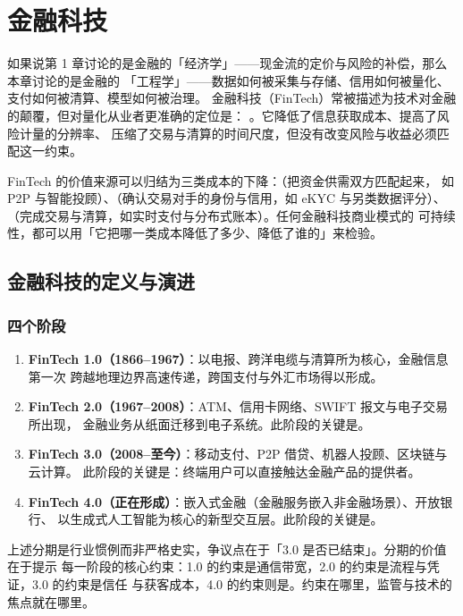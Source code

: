\chapter{金融科技}

如果说第 1 章讨论的是金融的「经济学」——现金流的定价与风险的补偿，那么本章讨论的是金融的
「工程学」——数据如何被采集与存储、信用如何被量化、支付如何被清算、模型如何被治理。
金融科技（FinTech）常被描述为技术对金融的颠覆，但对量化从业者更准确的定位是：
。它降低了信息获取成本、提高了风险计量的分辨率、
压缩了交易与清算的时间尺度，但没有改变风险与收益必须匹配这一约束。

\begin{keybox}
FinTech 的价值来源可以归结为三类成本的下降：（把资金供需双方匹配起来，
如 P2P 与智能投顾）、（确认交易对手的身份与信用，如 eKYC 与另类数据评分）、
（完成交易与清算，如实时支付与分布式账本）。任何金融科技商业模式的
可持续性，都可以用「它把哪一类成本降低了多少、降低了谁的」来检验。
\end{keybox}

\section{金融科技的定义与演进}

\subsection{四个阶段}

\begin{enumerate}[leftmargin=*]
  \item \textbf{FinTech 1.0（1866--1967）}：以电报、跨洋电缆与清算所为核心，金融信息第一次
        跨越地理边界高速传递，跨国支付与外汇市场得以形成。
  \item \textbf{FinTech 2.0（1967--2008）}：ATM、信用卡网络、SWIFT 报文与电子交易所出现，
        金融业务从纸面迁移到电子系统。此阶段的关键是。
  \item \textbf{FinTech 3.0（2008--至今）}：移动支付、P2P 借贷、机器人投顾、区块链与云计算。
        此阶段的关键是：终端用户可以直接触达金融产品的提供者。
  \item \textbf{FinTech 4.0（正在形成）}：嵌入式金融（金融服务嵌入非金融场景）、开放银行、
        以生成式人工智能为核心的新型交互层。此阶段的关键是。
\end{enumerate}

\begin{notebox}[分期的用意]
上述分期是行业惯例而非严格史实，争议点在于「3.0 是否已结束」。分期的价值在于提示
每一阶段的核心约束：1.0 的约束是通信带宽，2.0 的约束是流程与凭证，3.0 的约束是信任
与获客成本，4.0 的约束则是。约束在哪里，监管与技术的焦点就在哪里。
\end{notebox}

